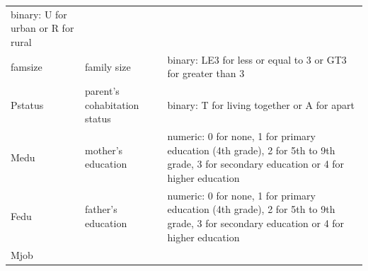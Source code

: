 \documentclass[]{article}
\begin{document}
\begin{longtable}[]{@{}lll@{}}
\begin{minipage}[t]{0.58\columnwidth}
binary: U for urban or R for rural\strut
\end{minipage}\tabularnewline
\begin{minipage}[t]{0.05\columnwidth}\raggedright
famsize\strut
\end{minipage} & \begin{minipage}[t]{0.28\columnwidth}\raggedright
family size\strut
\end{minipage} & \begin{minipage}[t]{0.58\columnwidth}\raggedright
binary: LE3 for less or equal to 3 or GT3 for greater than 3\strut
\end{minipage}\tabularnewline
\begin{minipage}[t]{0.05\columnwidth}\raggedright
Pstatus\strut
\end{minipage} & \begin{minipage}[t]{0.28\columnwidth}\raggedright
parent's cohabitation status\strut
\end{minipage} & \begin{minipage}[t]{0.58\columnwidth}\raggedright
binary: T for living together or A for apart\strut
\end{minipage}\tabularnewline
\begin{minipage}[t]{0.05\columnwidth}\raggedright
Medu\strut
\end{minipage} & \begin{minipage}[t]{0.28\columnwidth}\raggedright
mother's education\strut
\end{minipage} & \begin{minipage}[t]{0.58\columnwidth}\raggedright
numeric: 0 for none, 1 for primary education (4th grade), 2 for 5th to
9th grade, 3 for secondary education or 4 for higher education\strut
\end{minipage}\tabularnewline
\begin{minipage}[t]{0.05\columnwidth}\raggedright
Fedu\strut
\end{minipage} & \begin{minipage}[t]{0.28\columnwidth}\raggedright
father's education\strut
\end{minipage} & \begin{minipage}[t]{0.58\columnwidth}\raggedright
numeric: 0 for none, 1 for primary education (4th grade), 2 for 5th to
9th grade, 3 for secondary education or 4 for higher education\strut
\end{minipage}\tabularnewline
\begin{minipage}[t]{0.05\columnwidth}\raggedright
Mjob\strut
\end{minipage} & \begin{minipage}[t]{0.28\columnwidth}\raggedright

\end{minipage}
\end{longtable}
\end{document}
